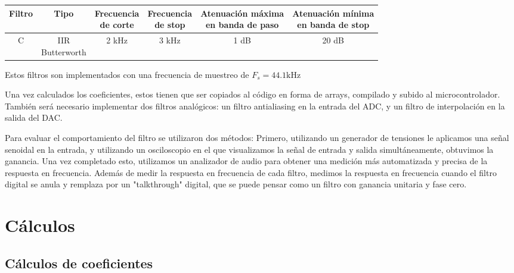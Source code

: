 \documentclass[11pt,a4paper]{report}
\begin{document}
\vspace{0.5cm}


\begin{tabular}{|c|c|c|c|c|c|}
    \hline
    Filtro & Tipo
    & \makecell{Frecuencia \\ de corte}
    & \makecell{Frecuencia \\ de stop}
    & \makecell{Atenuación máxima \\ en banda de paso}
    & \makecell{Atenuación mínima \\ en banda de stop}\\
    \hline
    C & \makecell{IIR \\ Butterworth} & 2 kHz & 3 kHz & 1 dB & 20 dB \\
    \hline
\end{tabular}

\vspace{0.5cm}


Estos filtros son implementados con una frecuencia de muestreo de $F_s = 44.1 \mathrm{kHz}$

 
Una vez calculados los coeficientes, estos tienen que ser copiados al código en forma de arrays, compilado y subido al microcontrolador. También será necesario implementar dos filtros analógicos: un filtro antialiasing en la entrada del ADC, y un filtro de interpolación en la salida del DAC.

Para evaluar el comportamiento del filtro se utilizaron dos métodos: Primero, utilizando un generador de tensiones le aplicamos una señal senoidal en la entrada, y utilizando un osciloscopio en el que visualizamos la señal de entrada y salida simultáneamente, obtuvimos la ganancia. Una vez completado esto, utilizamos un analizador de audio para obtener una medición más automatizada y precisa de la respuesta en frecuencia.
Además de medir la respuesta en frecuencia de cada filtro, medimos la respuesta en frecuencia cuando el filtro digital se anula y remplaza por un "talkthrough" digital, que se puede pensar como un filtro con ganancia unitaria y fase cero.

\chapter{Cálculos}


\section{Cálculos de coeficientes}
\end{document}
